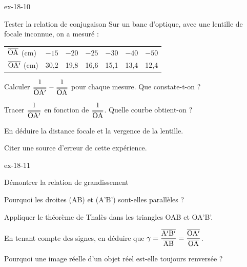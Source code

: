 \begin{blocLivre}{ex-18-10}
\begin{exercice}[2]{Tester la relation de conjugaison}
Sur un banc d'optique, avec une lentille de focale inconnue, on a mesuré :
\par\smallskip\noindent\hfill\begin{tabular}{lcccccc}
\toprule
$\overline{\mathrm{OA}}$ (cm) & $-15$ & $-20$ & $-25$ & $-30$ & $-40$ & $-50$ \\
$\overline{\mathrm{OA'}}$ (cm) & 30,2 & 19,8 & 16,6 & 15,1 & 13,4 & 12,4 \\
\bottomrule
\end{tabular}\hfill\null\par\smallskip
\begin{questions}
\item Calculer $\dfrac{1}{\overline{\mathrm{OA'}}}-\dfrac{1}{\overline{\mathrm{OA}}}$ pour chaque mesure. Que constate-t-on ?
\item Tracer $\dfrac{1}{\overline{\mathrm{OA'}}}$ en fonction de $\dfrac{1}{\overline{\mathrm{OA}}}$. Quelle courbe obtient-on ?
\item En déduire la distance focale et la vergence de la lentille.
\item Citer une source d'erreur de cette expérience.
\end{questions}
\end{exercice}
\end{blocLivre}
\begin{blocLivre}{ex-18-11}
\begin{exercice}[2]{Démontrer la relation de grandissement}
\begin{questions}
\item Pourquoi les droites (AB) et (A'B') sont-elles parallèles ?
\item Appliquer le théorème de Thalès dans les triangles OAB et OA'B'.
\item En tenant compte des signes, en déduire que $\gamma=\dfrac{\overline{\mathrm{A'B'}}}{\overline{\mathrm{AB}}}=\dfrac{\overline{\mathrm{OA'}}}{\overline{\mathrm{OA}}}$.
\item Pourquoi une image réelle d'un objet réel est-elle toujours renversée ?
\end{questions}
\end{exercice}
\end{blocLivre}

